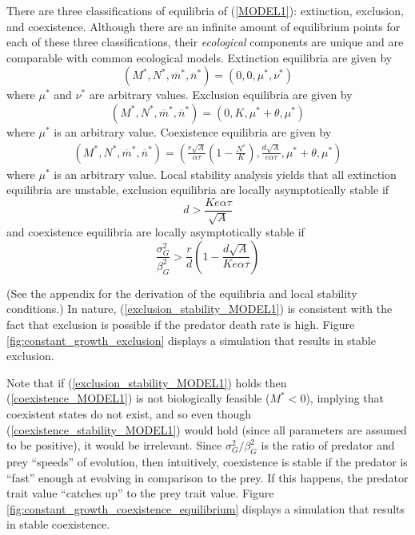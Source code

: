 \documentclass{amsart}
\theoremstyle{definition}
\theoremstyle{remark}
\numberwithin{equation}{section}
\begin{document}
There are three classifications of equilibria of (\ref{MODEL1}): extinction, exclusion, and coexistence.  Although there are an infinite amount of equilibrium points for each of these three classifications, their {\it ecological} components are unique and are comparable with common ecological models.  Extinction equilibria are given by
\begin{equation}
	\label{extinction_MODEL1}
	(M^*, N^*, \overline{m}^*, \overline{n}^*) = (0, 0, \mu^*, \nu^*)
\end{equation}
where $\mu^*$ and $\nu^*$ are arbitrary values.  Exclusion equilibria are given by
\begin{equation}
	\label{exclusion_MODEL1}
	(M^*, N^*, \overline{m}^*, \overline{n}^*) = (0, K, \mu^* + \theta, \mu^*)
\end{equation}
where $\mu^*$ is an arbitrary value.  Coexistence equilibria are given by
\begin{equation}
	\label{coexistence_MODEL1}
	\begin{aligned}
		(M^*, N^*, \overline{m}^*, \overline{n}^*) = \left(\frac{r\sqrt{A}}{\alpha\tau}\left(1 - \frac{N^*}{K}\right), \frac{d\sqrt{A}}{e\alpha\tau}, \mu^* + \theta, \mu^*\right)
	\end{aligned}
\end{equation}
where $\mu^*$ is an arbitrary value.  Local stability analysis yields that all extinction equilibria are unstable, exclusion equilibria are locally asymptotically stable if
\begin{equation}
	\label{exclusion_stability_MODEL1}
	d > \frac{Ke\alpha\tau}{\sqrt{A}}
\end{equation}
and coexistence equilibria are locally asymptotically stable if
\begin{equation}
	\label{coexistence_stability_MODEL1}
	\frac{\sigma_G^2}{\beta_G^2} > \frac{r}{d}\left(1 - \frac{d\sqrt{A}}{Ke\alpha\tau}\right)
\end{equation}

(See the appendix for the derivation of the equilibria and local stability conditions.)  In nature, (\ref{exclusion_stability_MODEL1}) is consistent with the fact that exclusion is possible if the predator death rate is high.  Figure \ref{fig:constant_growth_exclusion} displays a simulation that results in stable exclusion.

Note that if (\ref{exclusion_stability_MODEL1}) holds then (\ref{coexistence_MODEL1}) is not biologically feasible ($M^* < 0$), implying that coexistent states do not exist, and so even though (\ref{coexistence_stability_MODEL1}) would hold (since all parameters are assumed to be positive), it would be irrelevant.  Since $\sigma_G^2/\beta_G^2$ is the ratio of predator and prey ``speeds'' of evolution, then intuitively, coexistence is stable if the predator is ``fast'' enough at evolving in comparison to the prey.  If this happens, the predator trait value ``catches up'' to the prey trait value.  Figure \ref{fig:constant_growth_coexistence_equilibrium} displays a simulation that results in stable coexistence.
\end{document}
